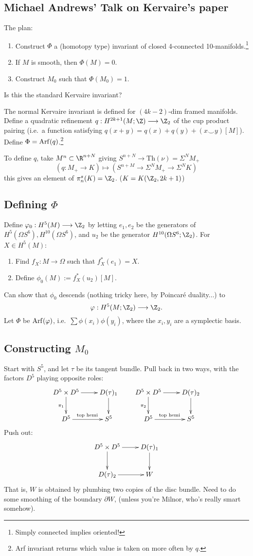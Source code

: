 \documentclass[11pt]{article}
\newcommand{\KanSemResponse}[1]
{
\thispagestyle{fancy}
\subsection*{#1}
}
\begin{document}
\begin{JandrKervaire}
\KanSemResponse
{Michael Andrews' Talk on Kervaire's paper}
The plan:
\begin{enumerate}
\item Construct $\Phi$ a (homotopy type) invariant of closed 4-connected 10-manifolds.\footnote{Simply connected implies oriented!}
\item If $M$ is smooth, then $\Phi(M)=0$.
\item Construct $M_0$ such that $\Phi(M_0)=1$.
\end{enumerate}
\begin{question}
Is this the standard Kervaire invariant?
\end{question}
The normal Kervaire invariant is defined for $(4k-2)$-dim framed manifolds. Define a quadratic refinement $q:H^{2k+1}(M;\Z)\to\Z_2$ of the cup product pairing (i.e.\ a function satisfying $q(x+y)=q(x)+q(y)+(x\smile y)[M]$). Define $\Phi=\operatorname{Arf}(q)$.\footnote{Arf invariant returns which value is taken on more often by $q$.}

To define $q$, take $M^n\subset \R^{n+N}$ giving $S^{n+N}\to\text{Th}(\nu)=\Sigma^NM_+$
\[\left(q:M_+\to K\right)\mapsto(S^{n+M}\to\Sigma^NM_+\to\Sigma^NK)\]
this gives an element of $\pi_n^s(K)=\Z_2$. ($K=K(\Z_2,2k+1)$)

\subsection*{Defining $\Phi$}
Define $\phi_0:H^5(M)\to\Z_2$ by letting $e_1,e_2$ be the generators of $H^5(\Omega S^6),H^{10}(\Omega S^6)$, and $u_2$ be the generator $H^{10}(\Omega S^6;\Z_2)$. For $X\in H^5(M)$:
\begin{enumerate}
\item Find $f_X:M\to\Omega$ such that $f_X^*(e_1)=X$.
\item Define $\phi_0(M):=f^*_X(u_2)[M]$.
\end{enumerate}
Can show that $\phi_0$ descends (nothing tricky here, by Poincar\'e duality...) to
\[\phi:H^5(M;\Z_2)\to\Z_2.\]
Let $\Phi$ be $\operatorname{Arf}(\varphi)$, i.e.\ $\sum\phi(x_i)\phi(y_i)$, where the $x_i,y_i$ are a symplectic basis.
\subsection*{Constructing $M_0$}
Start with $S^5$, and let $\tau$ be its tangent bundle.  Pull back in two ways, with the factors $D^5$ playing opposite roles:
\[\xymatrix{
D^5\times D^5\ar[d]_{\pi_1}\ar[r]&D(\tau)_1\ar[d]\\
D^5\ar[r]^{\text{top hemi}}&S^5
}\qquad
\xymatrix{
D^5\times D^5\ar[d]_{\pi_2}\ar[r]&D(\tau)_2\ar[d]\\
D^5\ar[r]^{\text{top hemi}}&S^5
}\]
Push out:
\[\xymatrix{
\ar[d]D^5\times D^5\ar[r]&D(\tau)_1\ar[d]\\
D(\tau)_2\ar[r]&W
}\]
That is, $W$ is obtained by plumbing two copies of the disc bundle.
Need to do some smoothing of the boundary $\partial W$, (unless you're Milnor, who's really smart somehow).


\end{JandrKervaire}
\end{document}
